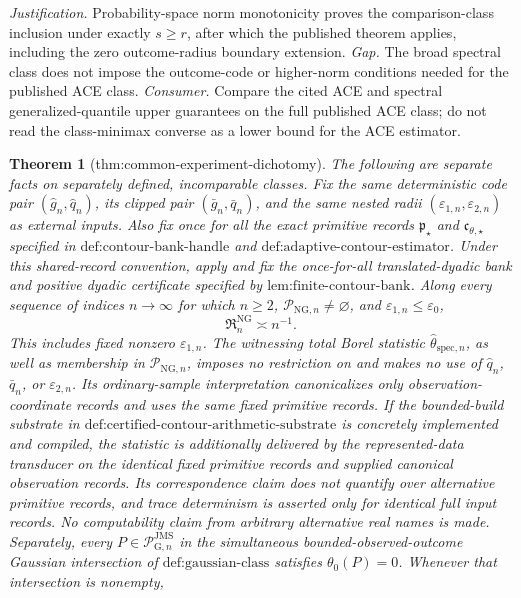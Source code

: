 \documentclass{article}
\newtheorem{theorem}{Theorem}
\begin{document}
\par\smallskip\noindent \textit{Justification.} Probability-space norm monotonicity proves the comparison-class inclusion under exactly \(s\ge r\), after which the published theorem applies, including the zero outcome-radius boundary extension. \textit{Gap.} The broad spectral class does not impose the outcome-code or higher-norm conditions needed for the published ACE class. \textit{Consumer.} Compare the cited ACE and spectral generalized-quantile upper guarantees on the full published ACE class; do not read the class-minimax converse as a lower bound for the ACE estimator.

\begin{theorem}[thm:common-experiment-dichotomy]\label{thm:common-experiment-dichotomy}
The following are separate facts on separately defined, incomparable classes. Fix the same deterministic code pair \((\widehat g_n,\widehat q_n)\), its clipped pair \((\bar g_n,\bar q_n)\), and the same nested radii \((\varepsilon_{1,n},\varepsilon_{2,n})\) as external inputs. Also fix once for all the exact primitive records \(\mathfrak p_{\star}\) and \(\mathfrak c_{\theta,\star}\) specified in \(\text{def:contour-bank-handle}\) and \(\text{def:adaptive-contour-estimator}\). Under this shared-record convention, apply and fix the once-for-all translated-dyadic bank and positive dyadic certificate specified by \(\text{lem:finite-contour-bank}\). Along every sequence of indices \(n\to\infty\) for which \(n\ge2\), \(\mathcal P_{\mathrm{NG},n}\neq\varnothing\), and \(\varepsilon_{1,n}\le\varepsilon_0\),
\[
 \mathfrak R_n^{\mathrm{NG}}\asymp n^{-1}.
\]
This includes fixed nonzero \(\varepsilon_{1,n}\). The witnessing total Borel statistic \(\widehat\theta_{\mathrm{spec},n}\), as well as membership in \(\mathcal P_{\mathrm{NG},n}\), imposes no restriction on and makes no use of \(\widehat q_n\), \(\bar q_n\), or \(\varepsilon_{2,n}\). Its ordinary-sample interpretation canonicalizes only observation-coordinate records and uses the same fixed primitive records. If the bounded-build substrate in \(\text{def:certified-contour-arithmetic-substrate}\) is concretely implemented and compiled, the statistic is additionally delivered by the represented-data transducer on the identical fixed primitive records and supplied canonical observation records. Its correspondence claim does not quantify over alternative primitive records, and trace determinism is asserted only for identical full input records. No computability claim from arbitrary alternative real names is made. Separately, every \(P\in\mathcal P_{\mathrm G,n}^{\mathrm{JMS}}\) in the simultaneous bounded-observed-outcome Gaussian intersection of \(\text{def:gaussian-class}\) satisfies \(\theta_0(P)=0\). Whenever that intersection is nonempty,

\end{theorem}
\end{document}
